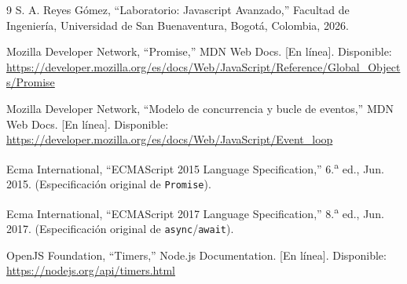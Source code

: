 \documentclass[conference,a4paper]{IEEEtran}
\begin{document}
\begin{thebibliography}{9}
S. A. Reyes G\'omez, ``Laboratorio: Javascript Avanzado,'' Facultad de Ingenier\'ia, Universidad de San Buenaventura, Bogot\'a, Colombia, 2026.

Mozilla Developer Network, ``Promise,'' MDN Web Docs. [En l\'inea]. Disponible: \url{https://developer.mozilla.org/es/docs/Web/JavaScript/Reference/Global_Objects/Promise}

Mozilla Developer Network, ``Modelo de concurrencia y bucle de eventos,'' MDN Web Docs. [En l\'inea]. Disponible: \url{https://developer.mozilla.org/es/docs/Web/JavaScript/Event_loop}

Ecma International, ``ECMAScript 2015 Language Specification,'' 6.\textsuperscript{a} ed., Jun. 2015. (Especificaci\'on original de \texttt{Promise}).

Ecma International, ``ECMAScript 2017 Language Specification,'' 8.\textsuperscript{a} ed., Jun. 2017. (Especificaci\'on original de \texttt{async}/\texttt{await}).

OpenJS Foundation, ``Timers,'' Node.js Documentation. [En l\'inea]. Disponible: \url{https://nodejs.org/api/timers.html}
\end{thebibliography}
\end{document}
